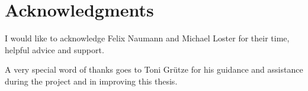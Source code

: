 \section*{Acknowledgments}
I would like to acknowledge Felix Naumann and Michael Loster for their time, helpful advice and support.

A very special word of thanks goes to Toni Grütze for his guidance and assistance during the project and in improving this thesis.